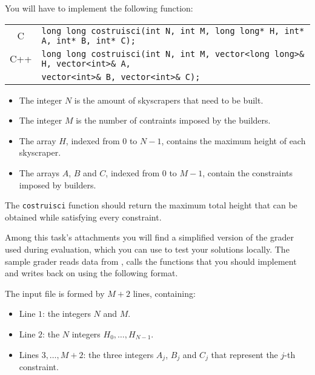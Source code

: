 You will have to implement the following function:

\begin{center}\begin{tabularx}{\textwidth}{|c|X|}
\hline
C  & \verb|long long costruisci(int N, int M, long long* H, int* A, int* B, int* C);|\\
C++ & \verb|long long costruisci(int N, int M, vector<long long>& H, vector<int>& A,|\\
& \hspace{3cm} \verb|vector<int>& B, vector<int>& C);|\\
\hline
\end{tabularx}\end{center}

\begin{itemize}[nolistsep]
	\item The integer $N$ is the amount of skyscrapers that need to be built.
	\item The integer $M$ is the number of contraints imposed by the builders.
	\item The array $H$, indexed from $0$ to $N-1$, contains the maximum height of
	      each skyscraper.
	\item The arrays $A$, $B$ and $C$, indexed from $0$ to $M-1$, contain the
	      constraints imposed by builders.
\end{itemize}

\medskip

The \texttt{costruisci} function should return the maximum total height that can
be obtained while satisfying every constraint.


\Grader

Among this task's attachments you will find a simplified version of the grader
used during evaluation, which you can use to test your solutions locally. The
sample grader reads data from , calls the functions that you should
implement and writes back on \outputfile{} using the following format.

The input file is formed by $M+2$ lines, containing:
\begin{itemize}[nolistsep,itemsep=2mm]
\item Line $1$: the integers $N$ and $M$.
\item Line $2$: the $N$ integers $H_0, \dots, H_{N-1}$.
\item Lines $3, \dots, M+2$: the three integers $A_j$, $B_j$ and $C_j$ that represent the $j$-th constraint.
\end{itemize}

